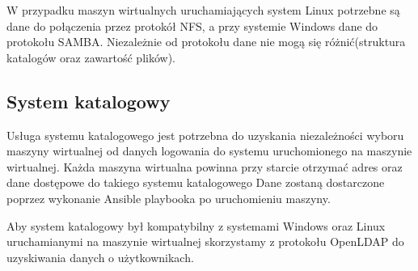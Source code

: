\documentclass[../../deliverable-two.tex]{subfiles}
\begin{document}
W przypadku maszyn wirtualnych uruchamiających system Linux potrzebne są dane do połączenia przez protokół NFS, a przy systemie Windows dane do protokołu SAMBA.
Niezależnie od protokołu dane nie mogą się różnić(struktura katalogów oraz zawartość plików).

\subsection{System katalogowy}
Usługa systemu katalogowego jest potrzebna do uzyskania niezależności wyboru maszyny wirtualnej od danych logowania do systemu uruchomionego na maszynie wirtualnej.
Każda maszyna wirtualna powinna przy starcie otrzymać adres oraz dane dostępowe do takiego systemu katalogowego
Dane zostaną dostarczone poprzez wykonanie Ansible playbooka po uruchomieniu maszyny.

Aby system katalogowy był kompatybilny z systemami Windows oraz Linux uruchamianymi na maszynie wirtualnej skorzystamy z protokołu OpenLDAP do uzyskiwania danych o użytkownikach.
\end{document}
